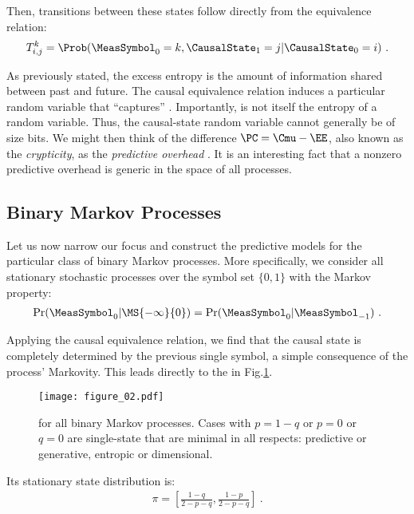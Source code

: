 \documentclass[final,nofootinbib,aps,pre,twocolumn,showpacs,groupaddress,preprintnumbers,floatfix]{revtex4-1}
\begin{document}
Then, transitions between these states follow directly from the equivalence relation:
\begin{align*}
  T_{i,j}^k = \Prob(\MeasSymbol_0 = k, \CausalState_{1} = j | \CausalState_{0} = i)~.
\end{align*}

As previously stated, the excess entropy \EE is the amount of information
shared between past and future. The causal equivalence relation induces a
particular random variable \CausalState that ``captures'' \EE. Importantly, \EE
is not itself the entropy of a random variable. Thus, the causal-state random
variable cannot generally be of size \EE bits. We might then think of the
difference $\PC = \Cmu - \EE$, also known as the \emph{crypticity}, as the
\emph{predictive overhead} \cite{Maho11a}. It is an interesting fact that a
nonzero predictive overhead \PC is generic in the space of all processes.

\subsection{Binary Markov Processes}
\label{sec:bmc_em}

Let us now narrow our focus and construct the predictive models for the
particular class of binary Markov processes. More specifically, we consider all
stationary stochastic processes over the symbol set $\{0,1\}$ with the Markov property:
\begin{align*}
  \Pr(\MeasSymbol_0 | \MS{-\infty}{0}) = \Pr(\MeasSymbol_0 | \MeasSymbol_{-1})
  ~.
\end{align*}

Applying the causal equivalence relation, we find that the causal state is
completely determined by the previous single symbol, a simple consequence of
the process' Markovity. This leads directly to the \eM in Fig.\nobreakspace \ref {fig:bmc_em}.

\begin{figure}
\centering
\texttt{[image: figure\_02.pdf]}
 \caption{\EM for all binary Markov processes. Cases with $p = 1-q$ or $p=0$ or
	$q=0$ are single-state \eMs that are minimal in all respects: predictive or
	generative, entropic or dimensional.
	}
\label{fig:bmc_em}
\end{figure}
Its stationary state distribution is:
\begin{align*}
  \pi = \left[ \frac{1-q}{2-p-q}, \frac{1-p}{2-p-q} \right]
  ~.
\end{align*}
\end{document}
